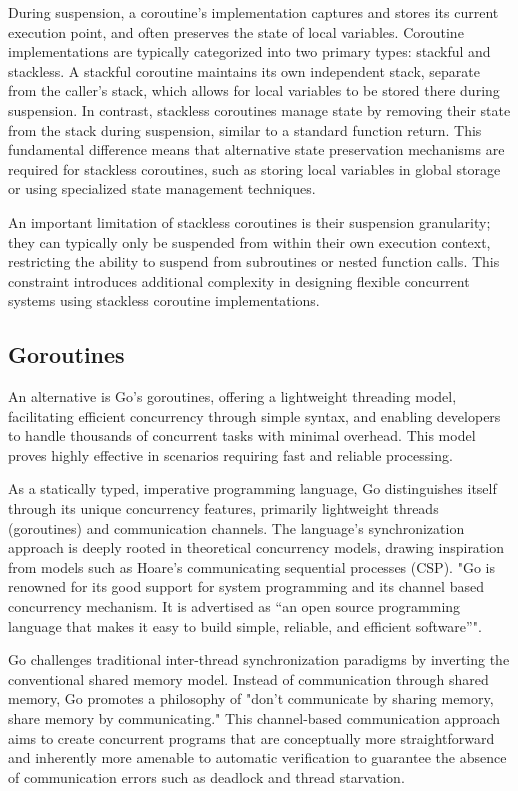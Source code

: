 \documentclass[]{project_interim}
\begin{document}
During suspension, a coroutine's implementation captures and stores
its current execution point, and often preserves the state of local variables.
Coroutine implementations are typically categorized into two primary types:
stackful and stackless. A stackful coroutine maintains its own independent
stack, separate from the caller's stack, which allows for local variables
to be stored there during suspension. In contrast, stackless coroutines
manage state by removing their state from the stack
during suspension, similar to a standard function return.\cite{belson_survey_2019}
This fundamental difference means that alternative state preservation
mechanisms are required for stackless coroutines, such as storing
local variables in global storage or using specialized state management techniques.

An important limitation of stackless coroutines is their suspension granularity;
they can typically only be suspended from within their own execution context,
restricting the ability to suspend from subroutines or nested function calls.
\cite{belson_survey_2019} This constraint introduces additional complexity
in designing flexible concurrent systems using stackless coroutine implementations.

\subsection{Goroutines}

An alternative is Go’s goroutines, offering a lightweight threading model,
facilitating efficient concurrency through
simple syntax, and enabling developers to handle thousands of concurrent tasks with
minimal overhead. This model proves highly effective in scenarios requiring fast
and reliable processing.

As a statically typed, imperative programming language, Go distinguishes
itself through its unique concurrency features, primarily lightweight threads
(goroutines) and communication channels.
The language's synchronization approach
is deeply rooted in theoretical concurrency models,
drawing inspiration from models such as Hoare's communicating sequential
processes (CSP).\cite{lange_empirical_2019}
"Go is renowned for its good support for system programming
and its channel based concurrency mechanism. It is advertised
as “an open source programming
language that makes it easy to build simple, reliable, and
efficient software”".\cite{lange_empirical_2019}

Go challenges traditional inter-thread synchronization
paradigms by inverting the conventional shared memory model. Instead
of communication through shared memory, Go promotes a philosophy of
"don't communicate by sharing memory, share memory by communicating."
This channel-based communication approach aims to create concurrent programs
that are conceptually more straightforward and inherently more amenable
to automatic verification to guarantee
the absence of communication errors such as deadlock and
thread starvation.\cite{lange_empirical_2019}
\end{document}
